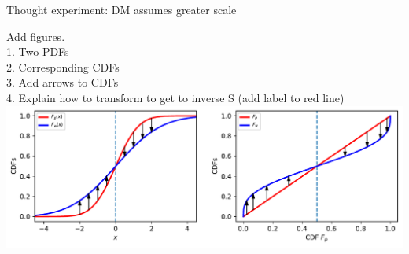 \begin{frame}{Thought experiment: DM assumes greater scale}

Add figures.\\
1. Two PDFs\\
2. Corresponding CDFs\\
3. Add arrows to CDFs\\
4. Explain how to transform to get to inverse S (add label to red line)\\

\centering
\vspace{1em}
	\includegraphics[width=.9\textwidth]{../../figs/mapping_cdfs.pdf}
\end{frame}


